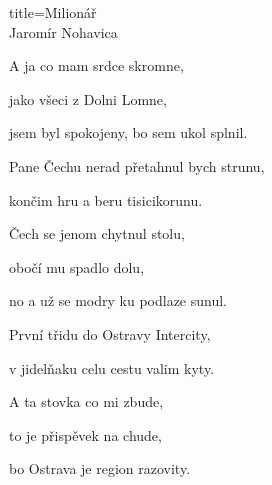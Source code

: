 \begin{song}{title=\predtitle\centering Milionář \\\large Jaromír Nohavica  \vspace*{-0.3cm}}
{\begin{centerjustified}
\begin{varwidth}[t]{0.53\textwidth}
A ja co mam srdce skromne,

jako všeci z Dolni Lomne,

jsem byl spokojeny, bo sem ukol splnil.

\sloka
Pane Čechu nerad přetahnul bych strunu,

končim hru a beru tisicikorunu.

Čech se jenom chytnul stolu,

obočí mu spadlo dolu,

no a už se modry ku podlaze sunul.

\sloka
První třidu do Ostravy Intercity,

v jidelňaku celu cestu valim kyty.

A ta stovka co mi zbude,

to je přispěvek na chude,

bo Ostrava je region razovity.


\end{varwidth}
\end{centerjustified}

}

\setcounter{Slokočet}{0}
\end{song}
